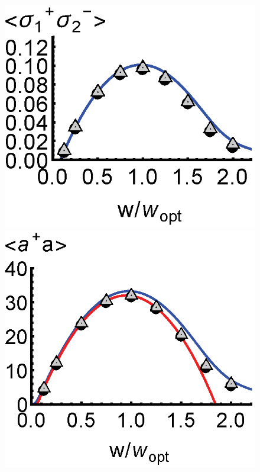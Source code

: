 \documentclass[aps,
twocolumn,
superscriptaddress,groupedaddress]{revtex4}
\begin{document}
\begin{figure}
\begin{center}
	\hspace{-5.0mm} \includegraphics[scale =0.38] {N40CrossoverSPSM.eps}
	\hspace{-5.0mm} \includegraphics[scale =0.38] {N40Crossoverada.eps}

\end{center}
\end{figure}
\end{document}
